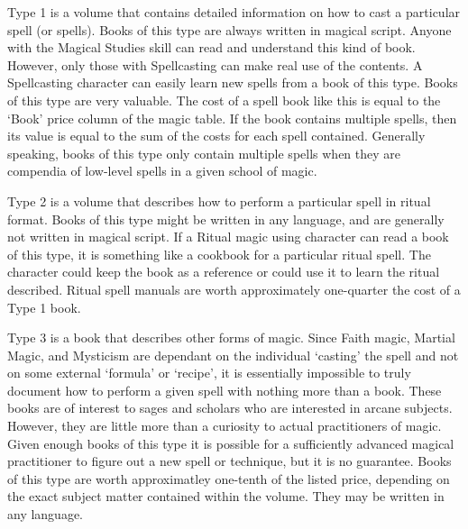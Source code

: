 \documentclass[twoside]{book}
\begin{document}
    {  
     Type 1 is a volume that contains detailed
               information on how to cast a particular spell (or spells).
               Books of this type are always written in magical script.
               Anyone with the Magical Studies skill can read and
               understand this kind of book. However, only those with
               Spellcasting can make real use of the contents. A
               Spellcasting character can easily learn new spells from a
               book of this type. Books of this type are very valuable.
               The cost of a spell book like this is equal to the
               `Book' price column of the magic table. If the
               book contains multiple spells, then its value is equal to
               the sum of the costs for each spell contained. Generally
               speaking, books of this type only contain multiple spells
               when they are compendia of low-level spells in a given
               school of magic. 
    }
  
    {  
     Type 2 is a volume that describes how to perform a
               particular spell in ritual format. Books of this type
               might be written in any language, and are generally not
               written in magical script. If a Ritual magic using
               character can read a book of this type, it is something
               like a cookbook for a particular ritual spell. The
               character could keep the book as a reference or could use
               it to learn the ritual described. Ritual spell manuals are
               worth approximately one-quarter the cost of a Type 1 book.
               
    }
  
    {  
     Type 3 is a book that describes other forms of
               magic. Since Faith magic, Martial Magic, and Mysticism are
               dependant on the individual `casting' the
               spell and not on some external `formula' or
               `recipe', it is essentially impossible to
               truly document how to perform a given spell with nothing
               more than a book. These books are of interest to sages and
               scholars who are interested in arcane subjects. However,
               they are little more than a curiosity to actual
               practitioners of magic. Given enough books of this type it
               is possible for a sufficiently advanced magical
               practitioner to figure out a new spell or technique, but
               it is no guarantee. Books of this type are worth
               approximatley one-tenth of the listed price, depending on
               the exact subject matter contained within the volume. They
               may be written in any language. 
    }
  
\end{document}
